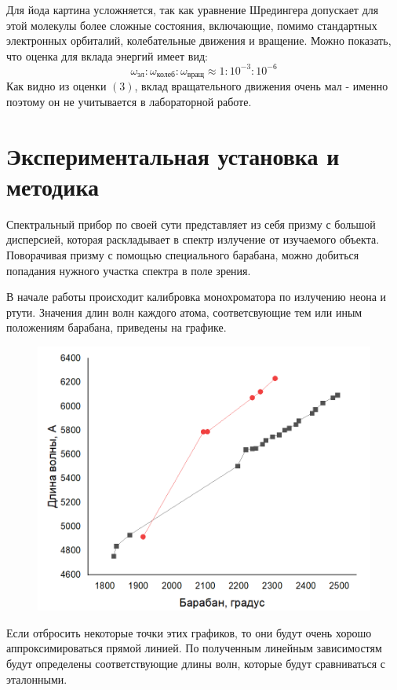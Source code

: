 \documentclass[%
 reprint,
 amsmath,amssymb,
 aps,
]{revtex4-2}
\begin{document}
Для йода картина усложняется, так как уравнение Шредингера допускает для этой молекулы более сложные состояния, включающие, помимо стандартных электронных орбиталий, колебательные движения и вращение. Можно показать, что оценка для вклада энергий имеет вид:
 \begin{equation}
 \omega_\text{эл}:\omega_\text{колеб}:\omega_\text{вращ} \approx 1 :10^{-3}:10^{-6}
 \end{equation}
Как видно из оценки $(3)$, вклад вращательного движения очень мал - именно поэтому он не учитывается в лабораторной работе. 
\section{Экспериментальная установка и методика}

Спектральный прибор по своей сути представляет из себя призму с большой дисперсией, которая раскладывает в спектр излучение от изучаемого объекта. Поворачивая призму с помощью специального барабана, можно добиться попадания нужного участка спектра в поле зрения.

В начале работы происходит калибровка монохроматора по излучению неона и ртути. Значения длин волн каждого атома, соответсвующие тем или иным положениям барабана, приведены на графике.

\begin{figure}
\includegraphics[scale = 0.7]{3.png}
\end{figure}

Если отбросить некоторые точки этих графиков, то они будут очень хорошо аппроксимироваться прямой линией. По полученным линейным зависимостям будут определены соответствующие длины волн, которые будут сравниваться с эталонными.
\end{document}
